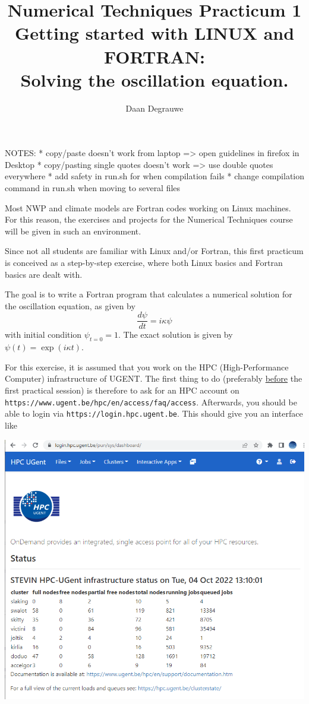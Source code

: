 \documentclass[a4paper]{article}
\title{%
	\bfseries%
	{\large Numerical Techniques Practicum 1}\\[3ex]
	{\Large Getting started with LINUX and FORTRAN:}\\[1ex]
	{\Large Solving the oscillation equation.}
}
\author{Daan Degrauwe}
\begin{document}
%
NOTES:
* copy/paste doesn't work from laptop => open guidelines in firefox in Desktop
* copy/pasting single quotes doesn't work => use double quotes everywhere
* add safety in run.sh for when compilation fails
* change compilation command in run.sh when moving to several files



\maketitle
%
\par
Most NWP and climate models are Fortran codes working on Linux machines. For this reason, the exercises and projects for the Numerical Techniques course will be given in such an environment.
%
\par
Since not all students are familiar with Linux and/or Fortran, this first practicum is conceived as a step-by-step exercise, where both Linux basics and Fortran basics are dealt with.
%
\par
The goal is to write a Fortran program that calculates a numerical solution for the oscillation equation, as given by
%
\begin{equation*}
	\frac{d\psi}{dt}=i\kappa\psi
\end{equation*}
%
with initial condition $\psi_{t=0}=1$. The exact solution is given by $\psi(t)=\exp(i\kappa t)$.
%
\par
For this exercise, it is assumed that you work on the HPC (High-Performance Computer) infrastructure of UGENT. The first thing to do (preferably \underline{before} the first practical session) is therefore to ask for an HPC account on \texttt{https://www.ugent.be/hpc/en/access/faq/access}. Afterwards, you should be able to login via \texttt{https://login.hpc.ugent.be}. This should give you an interface like
%
\begin{center}
	\includegraphics[scale=.4]{login_hpc}
\end{center}
\end{document}
